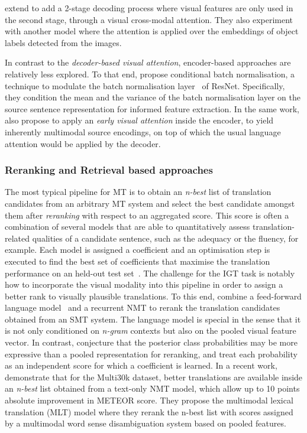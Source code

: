 \documentclass{svjour3}
\begin{document}
\cite{ive-etal-2019-distilling} extend \cite{libovicky-tfatt-2018} to add a 2-stage decoding process where visual features are only used in the second stage, through a visual cross-modal attention. They also experiment with another model where the attention is applied over the embeddings of object labels detected from the images.




In contrast to the \textit{decoder-based visual attention}, encoder-based approaches are relatively less explored. To that end, \cite{delbrouck-modulating-2017} propose conditional batch normalisation, a technique to modulate the batch normalisation layer~\citep{ioffe-batch-2015} of ResNet. Specifically, they condition the mean and the variance of the batch normalisation layer on the source sentence representation for informed feature extraction. In the same work,
\cite{delbrouck-modulating-2017} also propose to apply an \textit{early visual attention} inside the encoder, to yield inherently multimodal source encodings, on top of which the usual language attention would be applied by the decoder.


\subsubsection{Reranking and Retrieval based approaches}
\label{sec:tasks:ict:pipeline}
The most typical pipeline for MT is to obtain an \textit{n-best} list of translation candidates from an arbitrary MT system and select the best candidate amongst them after \textit{reranking} with respect to an aggregated score. This score is often a combination of several models that are able to quantitatively assess translation-related qualities of a candidate sentence, such as the adequacy or the fluency, for example. Each model is assigned a coefficient and an optimisation step is executed to find the best set of coefficients that maximise the translation performance on an held-out test set~\citep{och-mert-2003}.
The challenge for the IGT task is notably how to incorporate the visual modality into this pipeline in order to assign a better rank to visually plausible translations. To this end, \citet{caglayan-does-2016} combine a feed-forward language model~\citep{bengio-nplm-2003,schwenk-cslm-2006} and a recurrent NMT to rerank the translation candidates obtained from an SMT system. The language model is special in the sense that it is not only conditioned on \textit{n-gram} contexts but also on the pooled visual feature vector. In contrast, \citet{shah-wang-specia:2016:WMT} conjecture that the posterior class probabilities may be more expressive than a pooled representation for reranking, and treat each probability  as an independent score for which a coefficient is learned.
In a recent work, \citet{lala-EtAl:2018:WMT} demonstrate that for the Multi30k dataset,
better translations are available inside an \textit{n-best} list obtained from a text-only NMT model, which allow up to 10 points absolute improvement in METEOR score.
They propose the multimodal lexical translation (MLT) model where they rerank the n-best list with scores assigned by a multimodal word sense disambiguation system based on pooled features.
\end{document}
